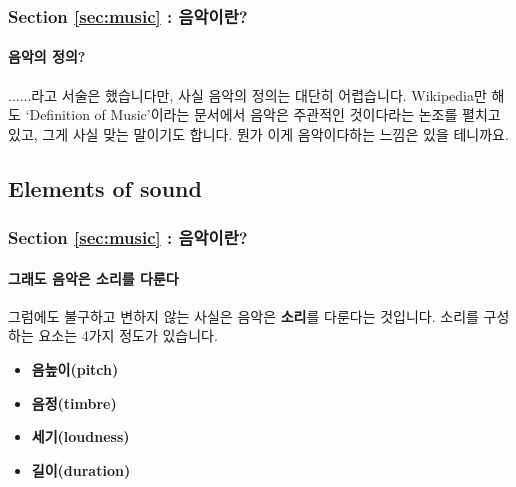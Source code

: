 \documentclass{beamer}
\begin{document}
	\begin{frame}
		\frametitle{Section \ref{sec:music} : 음악이란?}
		\framesubtitle{음악의 정의?}
		......라고 서술은 했습니다만, 사실 음악의 정의는 대단히 어렵습니다. Wikipedia만 해도 `Definition of Music'이라는 문서에서 음악은 주관적인 것이다라는 논조를 펼치고 있고, 그게 사실 맞는 말이기도 합니다. 뭔가 이게 음악이다하는 느낌은 있을 테니까요.
	\end{frame}
	
	\subsection{Elements of sound}
	\begin{frame}
		\frametitle{Section \ref{sec:music} : 음악이란?}
		\framesubtitle{그래도 음악은 소리를 다룬다}
		그럼에도 불구하고 변하지 않는 사실은 음악은 {\bf 소리}를 다룬다는 것입니다. 소리를 구성하는 요소는 4가지 정도가 있습니다.
		\begin{itemize}
			\item \bf 음높이(pitch)
			\item \bf 음정(timbre)
			\item \bf 세기(loudness)
			\item \bf 길이(duration)
		\end{itemize}
	\end{frame}
	
\end{document}
